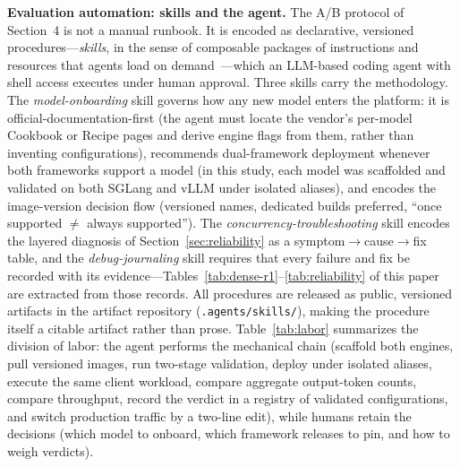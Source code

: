 \documentclass[11pt]{article}
\begin{document}
\textbf{Evaluation automation: skills and the agent.} The A/B protocol of Section~4 is not a manual runbook. It is encoded as declarative, versioned procedures---\emph{skills}, in the sense of composable packages of instructions and resources that agents load on demand~\cite{xu2026agentskills}---which an LLM-based coding agent with shell access executes under human approval. Three skills carry the methodology. The \emph{model-onboarding} skill governs how any new model enters the platform: it is official-documentation-first (the agent must locate the vendor's per-model Cookbook or Recipe pages and derive engine flags from them, rather than inventing configurations), recommends dual-framework deployment whenever both frameworks support a model (in this study, each model was scaffolded and validated on both SGLang and vLLM under isolated aliases), and encodes the image-version decision flow (versioned names, dedicated builds preferred, ``once supported $\ne$ always supported''). The \emph{concurrency-troubleshooting} skill encodes the layered diagnosis of Section~\ref{sec:reliability} as a symptom$\rightarrow$cause$\rightarrow$fix table, and the \emph{debug-journaling} skill requires that every failure and fix be recorded with its evidence---Tables~\ref{tab:dense-r1}--\ref{tab:reliability} of this paper are extracted from those records. All procedures are released as public, versioned artifacts in the artifact repository (\texttt{.agents/skills/}), making the procedure itself a citable artifact rather than prose. Table~\ref{tab:labor} summarizes the division of labor: the agent performs the mechanical chain (scaffold both engines, pull versioned images, run two-stage validation, deploy under isolated aliases, execute the same client workload, compare aggregate output-token counts, compare throughput, record the verdict in a registry of validated configurations, and switch production traffic by a two-line edit), while humans retain the decisions (which model to onboard, which framework releases to pin, and how to weigh verdicts).
\end{document}

